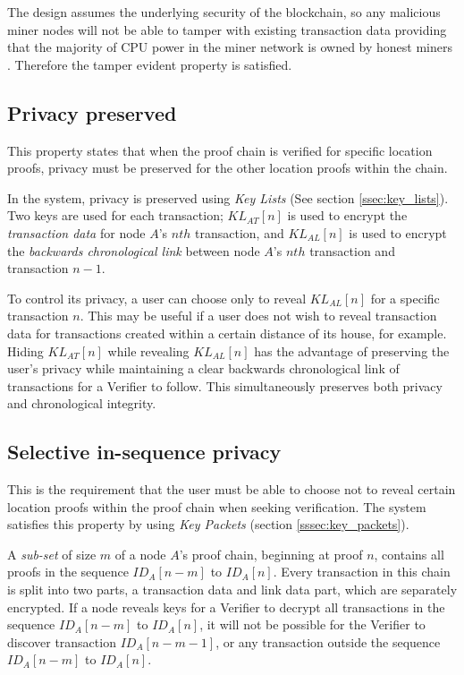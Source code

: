 The design assumes the underlying security of the blockchain, so any malicious miner nodes will not be able to tamper with existing transaction data providing that the majority of CPU power in the miner network is owned by honest miners \cite{bitcoin}. Therefore the tamper evident property is satisfied.

\subsection{Privacy preserved}
This property states that when the proof chain is verified for specific location proofs, privacy must be preserved for the other location proofs within the chain.

In the system, privacy is preserved using \textit{Key Lists} (See section \ref{ssec:key_lists}). Two keys are used for each transaction; $KL_{AT}[n]$ is used to encrypt the \textit{transaction data} for node $A$'s $nth$ transaction, and $KL_{AL}[n]$ is used to encrypt the \textit{backwards chronological link} between node $A$'s $nth$ transaction and transaction $n-1$.

To control its privacy, a user can choose only to reveal $KL_{AL}[n]$ for a specific transaction $n$. This may be useful if a user does not wish to reveal transaction data for transactions created within a certain distance of its house, for example. Hiding $KL_{AT}[n]$ while revealing $KL_{AL}[n]$ has the advantage of preserving the user's privacy while maintaining a clear backwards chronological link of transactions for a Verifier to follow. This simultaneously preserves both privacy and chronological integrity.

\subsection{Selective in-sequence privacy}
This is the requirement that the user must be able to choose not to reveal certain location proofs within the proof chain when seeking verification. The system satisfies this property by using \textit{Key Packets} (section \ref{sssec:key_packets}).

A \textit{sub-set} of size $m$ of a node $A$'s proof chain, beginning at proof $n$, contains all proofs in the sequence $ID_{A}[n-m]$ to $ID_{A}[n]$. Every transaction in this chain is split into two parts, a transaction data and link data part, which are separately encrypted. If a node reveals keys for a Verifier to decrypt all transactions in the sequence $ID_{A}[n-m]$ to $ID_{A}[n]$, it will not be possible for the Verifier to discover transaction $ID_{A}[n-m-1]$, or any transaction outside the sequence $ID_{A}[n-m]$ to $ID_{A}[n]$.

